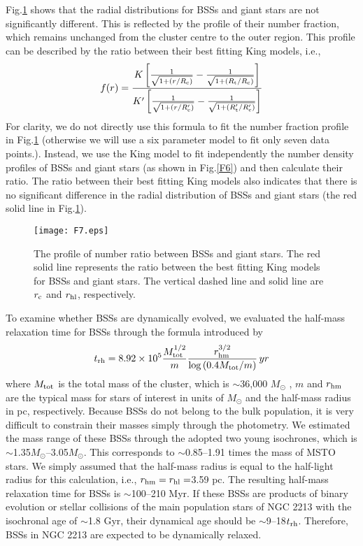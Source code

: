 \documentclass[useAMS,usenatbib,twocolumn]{mnras}
\begin{document}
Fig.\ref{F7} shows that the radial distributions for BSSs and giant stars are not significantly different. This is reflected by the profile of their number fraction, which remains unchanged from the cluster centre to the outer region. This profile can be described by the ratio between their best fitting King models, i.e.,
\begin{equation}
f(r)=\frac{K\left[\frac{1}{\sqrt{1+(r/R_{\rm c})}}-\frac{1}{\sqrt{1+(R_{\rm t}/R_{\rm c})}}\right]}{K'\left[\frac{1}{\sqrt{1+(r/R'_{\rm c})}}-\frac{1}{\sqrt{1+(R'_{\rm t}/R'_{\rm c})}}\right]}
\end{equation} 
For clarity, we do not directly use this formula to fit the number fraction profile in Fig.\ref{F7} (otherwise we will use a six parameter model to fit only seven data points.). Instead, we use the King model to fit independently the number density profiles of BSSs and giant stars (as shown in Fig.\ref{F6}) and then calculate their ratio. The ratio between their best fitting King models also indicates that there is no significant difference in the radial distribution of BSSs and giant stars (the red solid line in Fig.\ref{F7}). 

\begin{figure}
  \centering
  \texttt{[image: F7.eps]}
  \caption{The profile of number ratio between BSSs and giant stars. The red solid line represents the ratio between the best fitting King models for BSSs and giant stars. The vertical dashed line and solid line are $r_{\rm c}$ and $r_{\rm hl}$, respectively.}\label{F7}
\end{figure}

To examine whether BSSs are dynamically evolved, we evaluated the half-mass relaxation time for BSSs through the formula introduced by \cite{Meyl87a}
\begin{equation}
t_{\rm rh}=8.92\times10^5\frac{M_{\rm tot}^{1/2}}{{m}}\frac{r^{3/2}_{\rm hm}}{\log{(0.4M_{\rm tot}/{m})}}\,yr
\end{equation}
where $M_{\rm tot}$ is the total mass of the cluster, which is $\sim$36,000 $M_{\odot}$ \citep[see][]{Baum13a}, ${m}$ and $r_{\rm hm}$ are the typical mass for stars of interest in units of $M_{\odot}$ and the half-mass radius in pc, respectively. Because BSSs do not belong to the bulk population, it is very difficult to constrain their masses simply through the photometry. We estimated the mass range of these BSSs through the adopted two young isochrones, which is $\sim$1.35$M_{\odot}$--3.05$M_{\odot}$. This corresponds to $\sim$0.85--1.91 times the mass of MSTO stars. We simply assumed that the half-mass radius is equal to the half-light radius for this calculation, i.e., $r_{\rm hm}=r_{\rm hl}=$3.59 pc. The resulting half-mass relaxation time for BSSs is $\sim$100--210 Myr. If these BSSs are products of binary evolution or stellar collisions of the main population stars of NGC 2213 with the isochronal age of $\sim$1.8 Gyr, their dynamical age should be $\sim$9--18$t_{\rm rh}$. Therefore, BSSs in NGC 2213 are expected to be dynamically relaxed.
\end{document}
